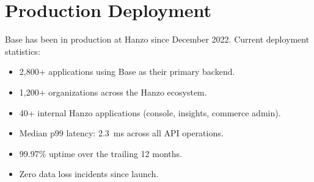 \section{Production Deployment}

\label{sec:production}

Base has been in production at Hanzo since December 2022. Current deployment
statistics:

\begin{itemize}[leftmargin=1.1em]
    \item 2,800+ applications using Base as their primary backend.
    \item 1,200+ organizations across the Hanzo ecosystem.
    \item 40+ internal Hanzo applications (console, insights, commerce admin).
    \item Median p99 latency: 2.3~ms across all API operations.
    \item 99.97\% uptime over the trailing 12 months.
    \item Zero data loss incidents since launch.
\end{itemize}

